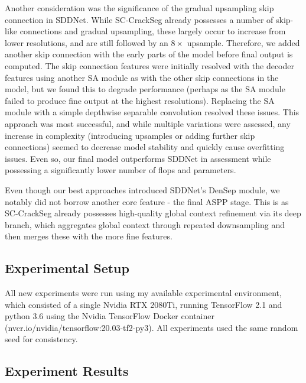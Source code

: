 \documentclass[a4paper,12pt]{report}
\begin{document}
Another consideration was the significance of the gradual upsampling skip connection in SDDNet. While SC-CrackSeg already possesses a number of skip-like connections and gradual upsampling, these largely occur to increase from lower resolutions, and are still followed by an $8 \times$ upsample. Therefore, we added another skip connection with the early parts of the model before final output is computed. The skip connection features were initially resolved with the decoder features using another SA module as with the other skip connections in the model, but we found this to degrade performance (perhaps as the SA module failed to produce fine output at the highest resolutions). Replacing the SA module with a simple depthwise separable convolution resolved these issues. This approach was most successful, and while multiple variations were assessed, any increase in complexity (introducing upsamples or adding further skip connections) seemed to decrease model stability and quickly cause overfitting issues. Even so, our final model outperforms SDDNet in assessment while possessing a significantly lower number of flops and parameters.%



Even though our best approaches introduced SDDNet's DenSep module, we notably did not borrow another core feature - the final ASPP stage. This is as SC-CrackSeg already possesses high-quality global context refinement via its deep branch, which aggregates global context through repeated downsampling and then merges these with the more fine features.

\subsection{Experimental Setup}
All new experiments were run using my available experimental environment, which consisted of a single Nvidia RTX 2080Ti, running TensorFlow 2.1 and python 3.6 using the Nvidia TensorFlow Docker container (nvcr.io/nvidia/tensorflow:20.03-tf2-py3). All experiments used the same random seed for consistency.

\subsection{Experiment Results}
\end{document}

